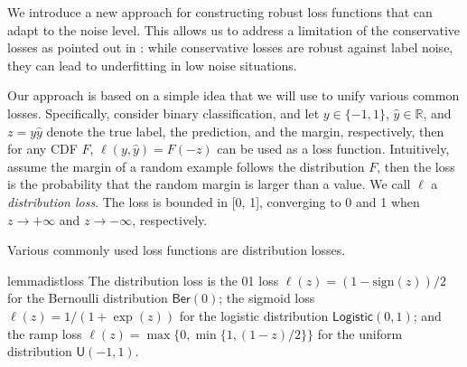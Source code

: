 \documentclass[letterpaper]{article} %
\newcommand{\R}{{\mathbb{R}}}
\newcommand{\ber}{{\mathsf{Ber}}}
\begin{document}
We introduce a new approach for constructing robust loss functions that can
adapt to the noise level.
This allows us to address a limitation of the conservative losses as pointed out
in :
while conservative losses are robust against label noise, they can lead to
underfitting in low noise situations.



Our approach is based on a simple idea that we will use to unify various common
losses.
Specifically, consider binary classification, and let
$y \in \{-1, 1\}$,
$\widehat{y} \in \R$,
and
$z = y\widehat{y}$
denote the true label, the prediction, and the margin,
respectively, then for any CDF $F$,
$\ell(y, \widehat{y}) = F(-z)$ can be used as a loss function.
Intuitively, assume the margin of a random example follows the distribution $F$,
then the loss is the probability that the random margin is larger than a value.
We call $\ell$ a \emph{distribution loss}.
The loss is bounded in [0, 1],
converging
to 0 and 1 when $z \to +\infty$
and $z \to -\infty$, respectively.

Various commonly used loss functions are distribution losses.

\begin{restatable}{lemma}{distloss}
    \label{lem:distloss}
	The distribution loss is
	the 01 loss $\ell(z)=(1-\mathrm{sign}(z))/2$
	for the Bernoulli distribution $\ber(0)$;
	the sigmoid loss $\ell(z)=1/(1+\exp(z))$
	for the logistic distribution $\mathsf{Logistic}(0,1)$;
	and the ramp loss $\ell(z)=\max\{0,\min\{1,(1-z)/2\}\}$
	for the uniform distribution $\mathsf{U}(-1,1)$.
\end{restatable}
\end{document}

